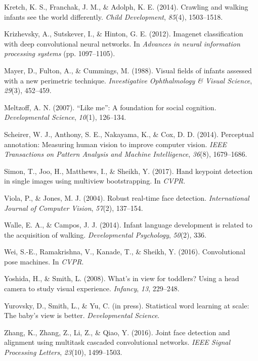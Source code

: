 \documentclass[10pt, letterpaper]{article}
\begin{document}
\hypertarget{ref-kretch2014}{}
Kretch, K. S., Franchak, J. M., \& Adolph, K. E. (2014). Crawling and
walking infants see the world differently. \emph{Child Development},
\emph{85}(4), 1503--1518.

\hypertarget{ref-krizhevsky2012imagenet}{}
Krizhevsky, A., Sutskever, I., \& Hinton, G. E. (2012). Imagenet
classification with deep convolutional neural networks. In
\emph{Advances in neural information processing systems} (pp.
1097--1105).

\hypertarget{ref-mayer1988}{}
Mayer, D., Fulton, A., \& Cummings, M. (1988). Visual fields of infants
assessed with a new perimetric technique. \emph{Investigative
Ophthalmology \& Visual Science}, \emph{29}(3), 452--459.

\hypertarget{ref-meltzoff2007like}{}
Meltzoff, A. N. (2007). ``Like me'': A foundation for social cognition.
\emph{Developmental Science}, \emph{10}(1), 126--134.

\hypertarget{ref-scheirer2014perceptual}{}
Scheirer, W. J., Anthony, S. E., Nakayama, K., \& Cox, D. D. (2014).
Perceptual annotation: Measuring human vision to improve computer
vision. \emph{IEEE Transactions on Pattern Analysis and Machine
Intelligence}, \emph{36}(8), 1679--1686.

\hypertarget{ref-simon2017hand}{}
Simon, T., Joo, H., Matthews, I., \& Sheikh, Y. (2017). Hand keypoint
detection in single images using multiview bootstrapping. In
\emph{CVPR}.

\hypertarget{ref-viola2004robust}{}
Viola, P., \& Jones, M. J. (2004). Robust real-time face detection.
\emph{International Journal of Computer Vision}, \emph{57}(2), 137--154.

\hypertarget{ref-walle2014}{}
Walle, E. A., \& Campos, J. J. (2014). Infant language development is
related to the acquisition of walking. \emph{Developmental Psychology},
\emph{50}(2), 336.

\hypertarget{ref-wei2016cpm}{}
Wei, S.-E., Ramakrishna, V., Kanade, T., \& Sheikh, Y. (2016).
Convolutional pose machines. In \emph{CVPR}.

\hypertarget{ref-yoshida2008}{}
Yoshida, H., \& Smith, L. (2008). What's in view for toddlers? Using a
head camera to study visual experience. \emph{Infancy}, \emph{13},
229--248.

\hypertarget{ref-yurovsky2012}{}
Yurovsky, D., Smith, L., \& Yu, C. (in press). Statistical word learning
at scale: The baby's view is better. \emph{Developmental Science}.

\hypertarget{ref-zhang2016}{}
Zhang, K., Zhang, Z., Li, Z., \& Qiao, Y. (2016). Joint face detection
and alignment using multitask cascaded convolutional networks.
\emph{IEEE Signal Processing Letters}, \emph{23}(10), 1499--1503.
\end{document}
